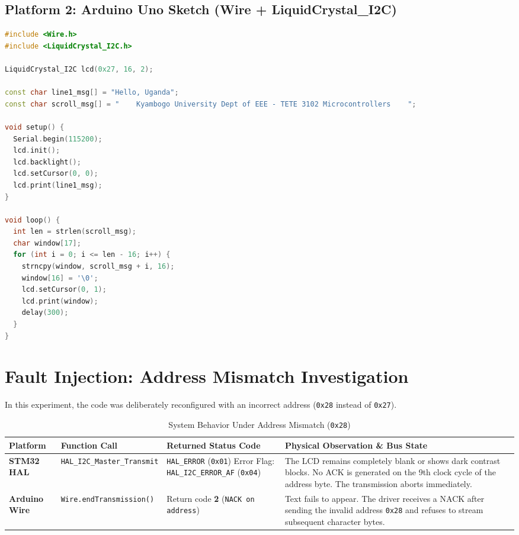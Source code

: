 \documentclass[11pt,a4paper]{article}
\begin{document}
\subsection{Platform 2: Arduino Uno Sketch (Wire + LiquidCrystal\_I2C)}
\begin{lstlisting}[language=C++, caption={Arduino Uno LCD Program with Dynamic Scrolling}]
#include <Wire.h>
#include <LiquidCrystal_I2C.h>

LiquidCrystal_I2C lcd(0x27, 16, 2);

const char line1_msg[] = "Hello, Uganda";
const char scroll_msg[] = "    Kyambogo University Dept of EEE - TETE 3102 Microcontrollers    ";

void setup() {
  Serial.begin(115200);
  lcd.init();
  lcd.backlight();
  lcd.setCursor(0, 0);
  lcd.print(line1_msg);
}

void loop() {
  int len = strlen(scroll_msg);
  char window[17];
  for (int i = 0; i <= len - 16; i++) {
    strncpy(window, scroll_msg + i, 16);
    window[16] = '\0';
    lcd.setCursor(0, 1);
    lcd.print(window);
    delay(300);
  }
}
\end{lstlisting}

\section{Fault Injection: Address Mismatch Investigation}
In this experiment, the code was deliberately reconfigured with an incorrect address (\texttt{0x28} instead of \texttt{0x27}).

\begin{table}[h!]
\centering
\small
\caption{System Behavior Under Address Mismatch (\texttt{0x28})}
\vspace{4pt}
\begin{tabularx}{\textwidth}{l p{4.5cm} p{4.5cm} X}
\toprule
\textbf{Platform} & \textbf{Function Call} & \textbf{Returned Status Code} & \textbf{Physical Observation \& Bus State} \\
\midrule
\textbf{STM32 HAL} 
    & \texttt{HAL\_I2C\_Master\_Transmit} 
    & \texttt{HAL\_ERROR} (\texttt{0x01}) \newline Error Flag: \texttt{HAL\_I2C\_ERROR\_AF} (\texttt{0x04}) 
    & The LCD remains completely blank or shows dark contrast blocks. No ACK is generated on the 9th clock cycle of the address byte. The transmission aborts immediately. \\
\midrule
\textbf{Arduino Wire} 
    & \texttt{Wire.endTransmission()} 
    & Return code \textbf{2} (\texttt{NACK on address}) 
    & Text fails to appear. The driver receives a NACK after sending the invalid address \texttt{0x28} and refuses to stream subsequent character bytes. \\
\bottomrule
\end{tabularx}
\end{table}
\end{document}
